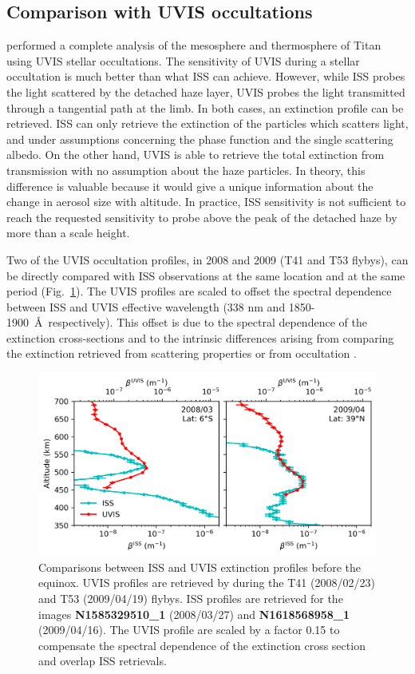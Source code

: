 \subsection{Comparison with UVIS occultations}

\cite{Koskinen2011} performed a complete analysis of the mesosphere and thermosphere of Titan using UVIS stellar
occultations. The sensitivity of UVIS during a stellar occultation is much better than what ISS can achieve. However,
while ISS probes the light scattered by the detached haze layer, UVIS probes the light transmitted through a tangential
path at the limb. In both cases, an extinction profile can be retrieved. ISS can only retrieve the extinction of the
particles which scatters light, and under assumptions concerning the phase function and the single scattering albedo.
On the other hand, UVIS is able to retrieve the total extinction from transmission with no assumption about the haze
particles. In theory, this difference is valuable because it would give a unique information about the change in aerosol
size with altitude. In practice, ISS sensitivity is not sufficient to reach the requested sensitivity to probe above
the peak of the detached haze by more than a scale height.

Two of the UVIS occultation profiles, in 2008 and 2009 (T41 and T53 flybys), can be directly compared with ISS
observations at the same location and at the same period (Fig.~\ref{fig:uvis_iss}). The UVIS profiles are scaled to
offset the spectral dependence between ISS and UVIS effective wavelength (338 nm and 1850-1900~\AA~respectively).
This offset is due to the spectral dependence of the extinction cross-sections and to the intrinsic
differences arising from comparing the extinction retrieved from scattering properties or from occultation
\citep[see.][]{Cours2011}.

\begin{figure}[!ht]
    \centering
    \includegraphics[width=.8\textwidth]{Fig/UVIS_ISS.png}
    \caption[UVIS comparison]{Comparisons between ISS and UVIS extinction profiles before the equinox.
            UVIS profiles are retrieved by \cite{Koskinen2011} during the T41 (2008/02/23) and T53 (2009/04/19) flybys.
            ISS profiles are retrieved for the images \textbf{N1585329510\_1} (2008/03/27) and
            \textbf{N1618568958\_1} (2009/04/16).
            The UVIS profile are scaled by a factor 0.15 to compensate the spectral dependence of the extinction
            cross section and overlap ISS retrievals.}
    \label{fig:uvis_iss}
\end{figure}

